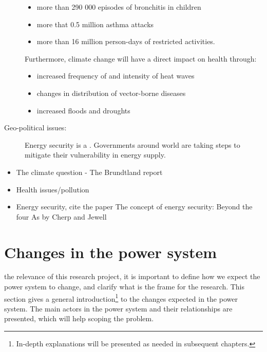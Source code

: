 \begin{description}
\begin{itemize}
			\item more than 290 000 episodes of bronchitis in children
			\item more that 0.5 million asthma attacks
			\item more than 16 million person-days of restricted activities.
		\end{itemize} 
		Furthermore, climate change will have a direct impact on health through:
		\begin{itemize}
			\item increased frequency of and intensity of heat waves
			\item changes in distribution of vector-borne diseases
			\item increased floods and droughts
		\end{itemize}
	\item[Geo-political issues:] Energy security is a . Governments around world are taking steps to mitigate their vulnerability in energy supply.
\end{description}

\begin{itemize}
	\item The climate question - The Brundtland report
	\item Health issues/pollution
	\item Energy security, cite the paper The concept of energy security: Beyond the four As by Cherp and Jewell
\end{itemize}



\section{Changes in the power system}%
\label{sec:powsysdesc}
  the relevance of this research project, it is important to define how we expect the power system to change, and clarify what is the frame for the research. This section gives a general introduction\footnote{In-depth explanations will be presented as needed in subsequent chapters.} to the changes expected in the power system. The main actors in the power system and their relationships are presented, which will help scoping the problem.
